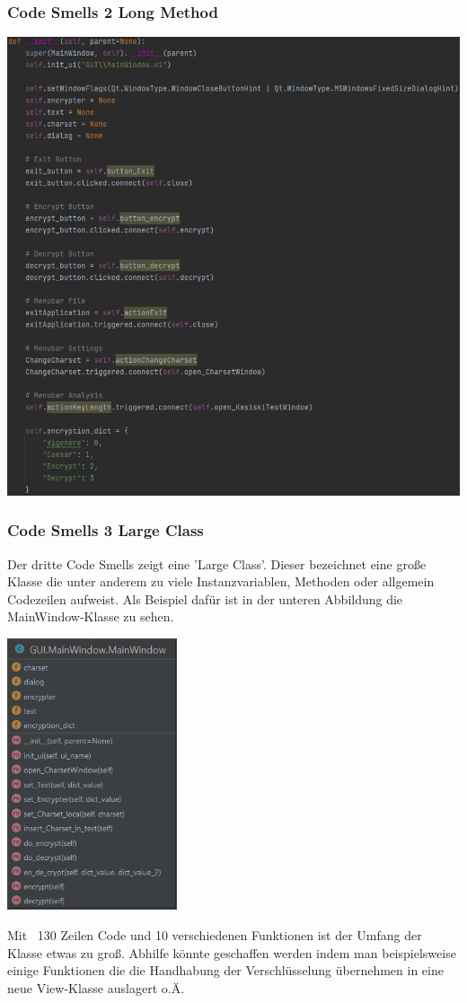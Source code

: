 \documentclass[12pt]{article}
\begin{document}
\subsubsection{Code Smells 2 Long Method}
\begin{center}
	\includegraphics[width=15cm]{bilder/CodeSmells2.png}
\end{center}

\subsubsection{Code Smells 3 Large Class}
Der dritte Code Smells zeigt eine 'Large Class'. Dieser bezeichnet eine große Klasse die unter anderem zu viele Instanzvariablen, Methoden oder allgemein Codezeilen aufweist. Als Beispiel dafür ist in der unteren Abbildung die MainWindow-Klasse zu sehen.
\begin{center}
	\includegraphics[width=5cm]{bilder/CodeSmells3.png}
\end{center}
Mit ~130 Zeilen Code und 10 verschiedenen Funktionen ist der Umfang der Klasse etwas zu groß. Abhilfe könnte geschaffen werden indem man beispielsweise einige Funktionen die die Handhabung der Verschlüsselung übernehmen in eine neue View-Klasse auslagert o.Ä.
\end{document}
